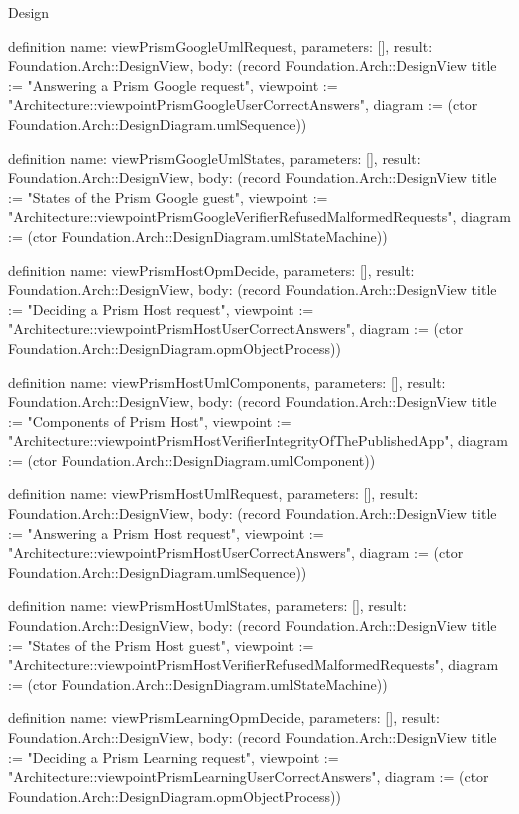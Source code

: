 \begin{lexlean}{Design}
\begin{semanticmodule}
definition{
  name: viewPrismGoogleUmlRequest,
  parameters: [],
  result: Foundation.Arch::DesignView,
  body: (record Foundation.Arch::DesignView {title := "Answering a Prism Google request", viewpoint := "Architecture::viewpointPrismGoogleUserCorrectAnswers", diagram := (ctor Foundation.Arch::DesignDiagram.umlSequence)})
}

definition{
  name: viewPrismGoogleUmlStates,
  parameters: [],
  result: Foundation.Arch::DesignView,
  body: (record Foundation.Arch::DesignView {title := "States of the Prism Google guest", viewpoint := "Architecture::viewpointPrismGoogleVerifierRefusedMalformedRequests", diagram := (ctor Foundation.Arch::DesignDiagram.umlStateMachine)})
}

definition{
  name: viewPrismHostOpmDecide,
  parameters: [],
  result: Foundation.Arch::DesignView,
  body: (record Foundation.Arch::DesignView {title := "Deciding a Prism Host request", viewpoint := "Architecture::viewpointPrismHostUserCorrectAnswers", diagram := (ctor Foundation.Arch::DesignDiagram.opmObjectProcess)})
}

definition{
  name: viewPrismHostUmlComponents,
  parameters: [],
  result: Foundation.Arch::DesignView,
  body: (record Foundation.Arch::DesignView {title := "Components of Prism Host", viewpoint := "Architecture::viewpointPrismHostVerifierIntegrityOfThePublishedApp", diagram := (ctor Foundation.Arch::DesignDiagram.umlComponent)})
}

definition{
  name: viewPrismHostUmlRequest,
  parameters: [],
  result: Foundation.Arch::DesignView,
  body: (record Foundation.Arch::DesignView {title := "Answering a Prism Host request", viewpoint := "Architecture::viewpointPrismHostUserCorrectAnswers", diagram := (ctor Foundation.Arch::DesignDiagram.umlSequence)})
}

definition{
  name: viewPrismHostUmlStates,
  parameters: [],
  result: Foundation.Arch::DesignView,
  body: (record Foundation.Arch::DesignView {title := "States of the Prism Host guest", viewpoint := "Architecture::viewpointPrismHostVerifierRefusedMalformedRequests", diagram := (ctor Foundation.Arch::DesignDiagram.umlStateMachine)})
}

definition{
  name: viewPrismLearningOpmDecide,
  parameters: [],
  result: Foundation.Arch::DesignView,
  body: (record Foundation.Arch::DesignView {title := "Deciding a Prism Learning request", viewpoint := "Architecture::viewpointPrismLearningUserCorrectAnswers", diagram := (ctor Foundation.Arch::DesignDiagram.opmObjectProcess)})
}


\end{semanticmodule}
\end{lexlean}
